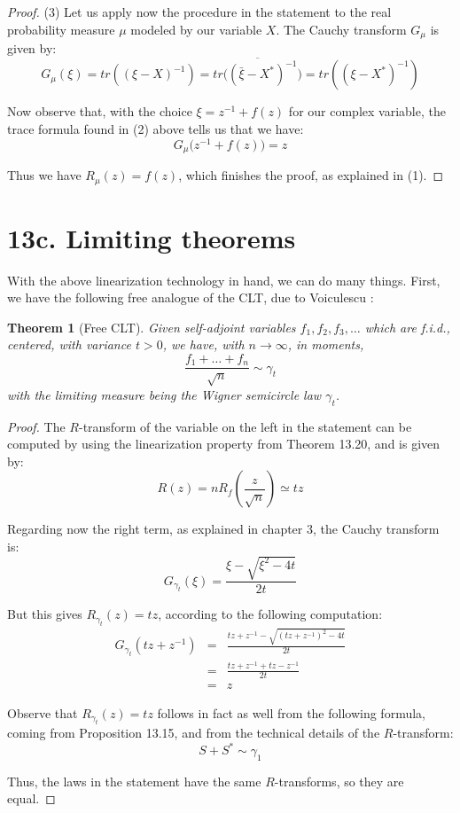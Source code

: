 \documentclass[12pt]{amsbook}
\newtheorem{theorem}{Theorem}[chapter]
\begin{document}
\begin{proof}
(3) Let us apply now the procedure in the statement to the real probability measure $\mu$ modeled by our variable $X$. The Cauchy transform $G_\mu$ is given by:
$$G_\mu(\xi)
=tr((\xi-X)^{-1})
=\overline{tr\Big((\bar{\xi}-X^*)^{-1}\Big)}
=tr((\xi-X^*)^{-1})$$

Now observe that, with the choice $\xi=z^{-1}+f(z)$ for our complex variable, the trace formula found in (2) above tells us that we have:
$$G_\mu\big(z^{-1}+f(z)\big)=z$$

Thus we have $R_\mu(z)=f(z)$, which finishes the proof, as explained in (1).
\end{proof}

\section*{13c. Limiting theorems}

With the above linearization technology in hand, we can do many things. First, we have the following free analogue of the CLT, due to Voiculescu \cite{vo1}:


\begin{theorem}[Free CLT]
Given self-adjoint variables $f_1,f_2,f_3,\ldots$ which are f.i.d., centered, with variance $t>0$, we have, with $n\to\infty$, in moments,
$$\frac{f_1+\ldots+f_n}{\sqrt{n}}\sim\gamma_t$$
with the limiting measure being the Wigner semicircle law $\gamma_t$.
\end{theorem}

\begin{proof}
The $R$-transform of the variable on the left in the statement can be computed by using the linearization property from Theorem 13.20, and is given by:
$$R(z)
=nR_f\left(\frac{z}{\sqrt{n}}\right)
\simeq tz$$

Regarding now the right term, as explained in chapter 3, the Cauchy transform is:
$$G_{\gamma_t}(\xi)=\frac{\xi-\sqrt{\xi^2-4t}}{2t}$$

But this gives $R_{\gamma_t}(z)=tz$, according to the following computation:
\begin{eqnarray*}
G_{\gamma_t}(tz+z^{-1})
&=&\frac{tz+z^{-1}-\sqrt{(tz+z^{-1})^2-4t}}{2t}\\
&=&\frac{tz+z^{-1}+tz-z^{-1}}{2t}\\
&=&z
\end{eqnarray*}

Observe that $R_{\gamma_t}(z)=tz$ follows in fact as well from the following formula, coming from Proposition 13.15, and from the technical details of the $R$-transform:
$$S+S^*\sim\gamma_1$$

Thus, the laws in the statement have the same $R$-transforms, so they are equal.
\end{proof}
\end{document}
